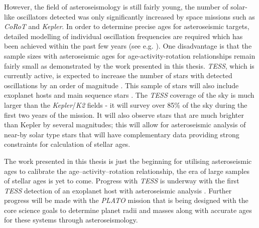 However, the field of asteroseismology is still fairly young, the number of solar-like oscillators detected was only significantly increased by space missions such as \textit{CoRoT} and \textit{Kepler}. In order to determine precise ages for asteroseismic targets, detailed modelling of individual oscillation frequencies are required which has been achieved within the past few years (see e.g. \citealt{Silva_Aguirre_etal_2017}). One disadvantage is that the sample sizes with asteroseismic ages for age-activity-rotation relationships remain fairly small as demonstrated by the work presented in this thesis. \textit{TESS}, which is currently active, is expected to increase the number of stars with detected oscillations by an order of magnitude \citep{Schofield_etal_2019}. This sample of stars will also include exoplanet hosts and main sequence stars \citep{Campante_etal_2016}. The \textit{TESS} coverage of the sky is much larger than the \textit{Kepler}/\textit{K2} fields - it will survey over 85\% of the sky during the first two years of the mission. It will also observe stars that are much brighter than Kepler by several magnitudes; this will allow for asteroseismic analysis of near-by solar type stars that will have complementary data providing strong constraints for calculation of stellar ages.

The work presented in this thesis is just the beginning for utilising asteroseismic ages to calibrate the age--activity--rotation relationship, the era of large samples of stellar ages is yet to come. Progress with \textit{TESS} is underway with the first \textit{TESS} detection of an exoplanet host with asteroseismic analysis \citep{Huber_etal_2019}. Further progress will be made with the \textit{PLATO} mission \citep{Rauer_etal_2014} that is being designed with the core science goals to determine planet radii and masses along with accurate ages for these systems through asteroseismology.